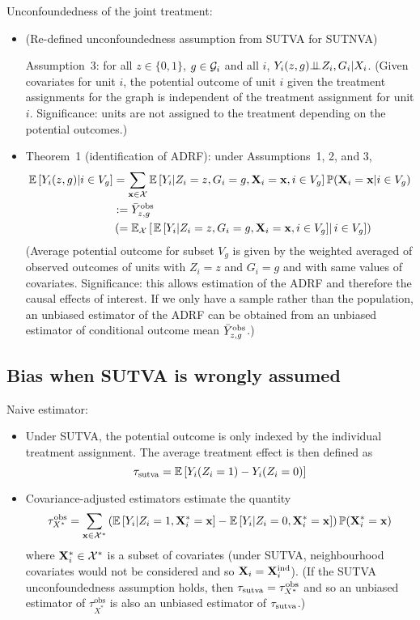 \documentclass[10pt]{article}
\begin{document}
Unconfoundedness of the joint treatment:

\begin{itemize}

\item
(Re-defined unconfoundedness assumption from SUTVA for SUTNVA)

Assumption~3: for all $z\in\{0,1\}$, $g\in\mathcal{G}_i$ and all $i$, $Y_i(z,g){\perp\!\!\!\perp} Z_i, G_i|X_i$. (Given covariates for unit $i$, the potential outcome of unit $i$ given the treatment assignments for the graph is independent of the treatment assignment for unit $i$. Significance: units are not assigned to the treatment depending on the potential outcomes.)

\item
Theorem~1 (identification of ADRF): under Assumptions~1, 2, and 3,
\begin{align*}
\mathbb{E}\left[Y_i(z,g)|i\in V_g\right] &= \sum_{\mathbf{x}\in\mathcal{X}}\mathbb{E}\left[Y_i|Z_i=z,G_i=g,\mathbf{X}_i=\mathbf{x},i\in V_g\right]\mathbb{P}(\mathbf{X}_i=\mathbf{x}|i\in V_g) \\
& := \bar{Y}^{\text{obs}}_{z,g} \\
&\left(= \mathbb{E}_{\mathcal{X}}\left[\left.\mathbb{E}\left[Y_i|Z_i=z,G_i=g,\mathbf{X}_i=\mathbf{x},i\in V_g\right]\right|i\in V_g\right]\right)
\end{align*}
(Average potential outcome for subset $V_g$ is given by the weighted averaged of observed outcomes of units with $Z_i=z$ and $G_i=g$ and with same values of covariates. Significance: this allows estimation of the ADRF and therefore the causal effects of interest. If we only have a sample rather than the population, an unbiased estimator of the ADRF can be obtained from an unbiased estimator of conditional outcome mean $\bar{Y}^{\text{obs}}_{z,g}$.)

\end{itemize}

\subsection{Bias when SUTVA is wrongly assumed}

Naive estimator:

\begin{itemize}

\item
Under SUTVA, the potential outcome is only indexed by the individual treatment assignment. The average treatment effect is then defined as
\[
\tau_\text{sutva} = \mathbb{E}\left[Y_i(Z_i=1) - Y_i(Z_i=0)\right]
\]

\item
Covariance-adjusted estimators estimate the quantity
\[
\tau_{X^*}^\text{obs} = \sum_{\mathbf{x}\in\mathcal{X}^*}\left(\mathbb{E}\left[Y_i|Z_i=1,\mathbf{X}_i^*=\mathbf{x}\right] - \mathbb{E}\left[Y_i|Z_i=0,\mathbf{X}_i^*=\mathbf{x}\right]\right)\mathbb{P}(\mathbf{X}_i^*=\mathbf{x})
\]
where $\mathbf{X}_i^*\in\mathcal{X}^*$ is a subset of covariates (under SUTVA, neighbourhood covariates would not be considered and so $\mathbf{X}_i=\mathbf{X}^{\text{ind}}_i$). (If the SUTVA unconfoundedness assumption holds, then $\tau_\text{sutva}=\tau_{X^*}^\text{obs}$ and so an unbiased estimator of $\tau_{X^*}^\text{obs}$ is also an unbiased estimator of $\tau_\text{sutva}$.)

\end{itemize}
\end{document}

